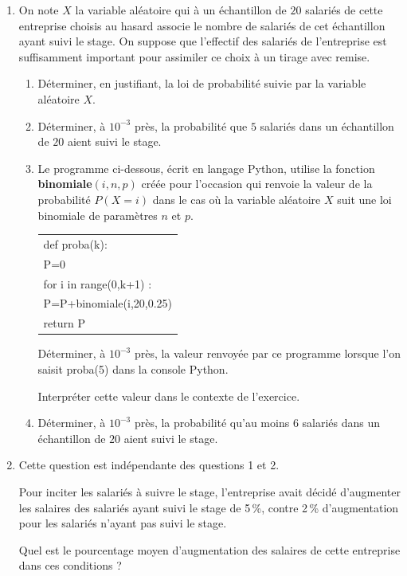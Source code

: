 \begin{enumerate}[resume]
\item On note $X$ la variable aléatoire qui à un échantillon de $20$ salariés de cette entreprise choisis au hasard associe le nombre de salariés de cet échantillon ayant suivi le stage. On suppose que l'effectif des salariés de l'entreprise est suffisamment important pour assimiler ce choix à un tirage avec  remise.
	\begin{enumerate}
		\item Déterminer, en justifiant, la loi de probabilité suivie par la variable aléatoire $X$.
		\item Déterminer, à $10^{-3}$ près, la probabilité que $5$ salariés dans un échantillon de $20$ aient suivi le stage.
		\item Le programme ci-dessous, écrit en langage Python, utilise la fonction \textbf{binomiale$(i, n, p)$} créée pour l'occasion qui renvoie
la valeur de la probabilité $P(X = i)$ dans le cas où la variable aléatoire $X$ suit une loi binomiale de paramètres $n$ et $p$.

\begin{center}
\begin{tabular}{|l|}\hline
def proba(k):\\
\quad  P=0\\
\quad for i in range(0,k+1) :\\
\qquad P=P+binomiale(i,20,0.25)\\
\quad return P\\ \hline
\end{tabular}
\end{center}

Déterminer, à $10^{-3}$ près, la valeur renvoyée par ce programme lorsque l'on saisit proba(5) dans la console Python. 

Interpréter cette valeur dans le contexte de l'exercice.
		\item Déterminer, à $10^{-3}$ près, la probabilité qu'au moins $6$ salariés dans un échantillon de $20$ aient suivi le stage.
		\end{enumerate}	
\item Cette question est indépendante des questions 1 et 2.

Pour inciter les salariés à suivre le stage, l'entreprise avait décidé d'augmenter les salaires des salariés ayant suivi le stage de 5\,\%, contre 2\,\% d'augmentation pour les salariés n'ayant pas suivi le stage. 

Quel est le pourcentage moyen d'augmentation des salaires de cette entreprise dans ces conditions ?

\end{enumerate}

\bigskip
